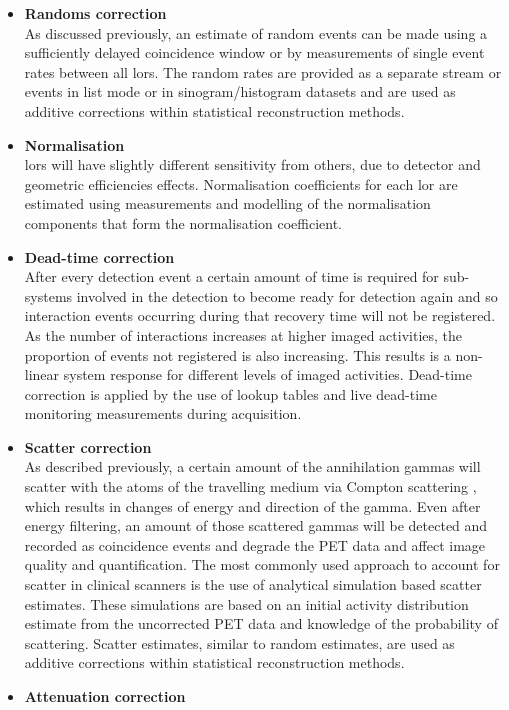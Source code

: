 \begin{itemize}
\item\textbf{Randoms correction}\\
As discussed previously, an estimate of random events can be made using a sufficiently delayed coincidence window or by measurements of single event rates between all \glspl{lor}. The random rates are provided as a separate stream or events in list mode or in sinogram/histogram datasets and are used as additive corrections within statistical reconstruction methods. 
\item\textbf{Normalisation}\\ 
\Glspl{lor} will have slightly different sensitivity from others, due to detector and geometric efficiencies effects. Normalisation coefficients for each \gls{lor} are estimated using measurements and modelling of the normalisation components that form the normalisation coefficient.
\item\textbf{Dead-time correction}\\
After every detection event a certain amount of time is required for sub-systems involved in the detection to become ready for detection again and so interaction events occurring during that recovery time will not be registered. As the number of interactions increases at higher imaged activities, the proportion of events not registered is also increasing. This results is a non-linear system response for different levels of imaged activities. Dead-time correction is applied by the use of lookup tables and live dead-time monitoring measurements during acquisition.
\item\textbf{Scatter correction}\\
As described previously, a certain amount of the annihilation gammas will scatter with the atoms of the travelling medium via Compton scattering , which results in changes of energy and direction of the gamma. Even after energy filtering, an amount of those scattered gammas will be detected and recorded as coincidence events and degrade the PET data and affect image quality and quantification. The most commonly used approach to account for scatter in clinical scanners is the use of analytical simulation based scatter estimates. These simulations are based on an initial activity distribution estimate from the uncorrected PET data and knowledge of the probability of scattering. Scatter estimates, similar to random estimates, are used as additive corrections within statistical reconstruction methods.
\item\textbf{Attenuation correction}\\

\end{itemize}
